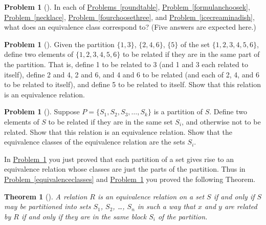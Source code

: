 \documentclass[10pt,]{book}
\theoremstyle{plain}
\newtheorem{theorem}{Theorem}[section]
\theoremstyle{definition}
\newtheorem{activity}[project]{Problem}
\theoremstyle{definition}
\numberwithin{equation}{chapter}
\begin{document}
\begin{activity}[]\marginsymbol[-1em]{} \label{partitiontoequivalence}
In each of \hyperref[roundtable]{Problems~\ref{roundtable}}, \hyperref[formulanchoosek]{Problem~\ref{formulanchoosek}}, \hyperref[necklace]{Problem~\ref{necklace}}, \hyperref[fourchoosethree]{Problem~\ref{fourchoosethree}}, and \hyperref[icecreaminadish]{Problem~\ref{icecreaminadish}}, what does an equivalence class correspond to? (Five answers are expected here.)%
\end{activity}
\begin{activity}[]\marginsymbol[-1em]{} \label{activity-354}
Given the partition \(\{1,3\}\), \(\{2,4,6\}\), \(\{5\}\) of the set \(\{1,2,3,4,5,6\}\), define two elements of \(\{1,2,3,4,5,6\}\) to be related if they are in the same part of the partition. That is, define 1 to be related to 3 (and 1 and 3 each related to itself), define 2 and 4, 2 and 6, and 4 and 6 to be related (and each of 2, 4, and 6 to be related to itself), and define 5 to be related to itself. Show that this relation is an equivalence relation.%
\end{activity}
\begin{activity}[]\marginsymbol[-1em]{} \label{activity-355}
Suppose \(P = \{S_1, S_2, S_3, \ldots, S_k\}\) is a partition of \(S\). Define two elements of \(S\) to be related if they are in the same set \(S_i\), and otherwise not to be related. Show that this relation is an equivalence relation. Show that the equivalence classes of the equivalence relation are the sets \(S_i\).%
\end{activity}
In \hyperref[partitiontoequivalence]{Problem~\ref{partitiontoequivalence}} you just proved that each partition of a set gives rise to an equivalence relation whose classes are just the parts of the partition. Thus in \hyperref[equivalenceclasses]{Problem~\ref{equivalenceclasses}} and \hyperref[partitiontoequivalence]{Problem~\ref{partitiontoequivalence}} you proved the following Theorem.%
\begin{theorem}[{}]\label{theorem-11}
A relation \(R\) is an equivalence relation on a set \(S\) if and only if \(S\) may be partitioned into sets \(S_1\), \(S_2\), \dots{}, \(S_n\) in such a way that \(x\) and \(y\) are related by \(R\) if and only if they are in the same block \(S_i\) of the partition. %
\end{theorem}
\end{document}
